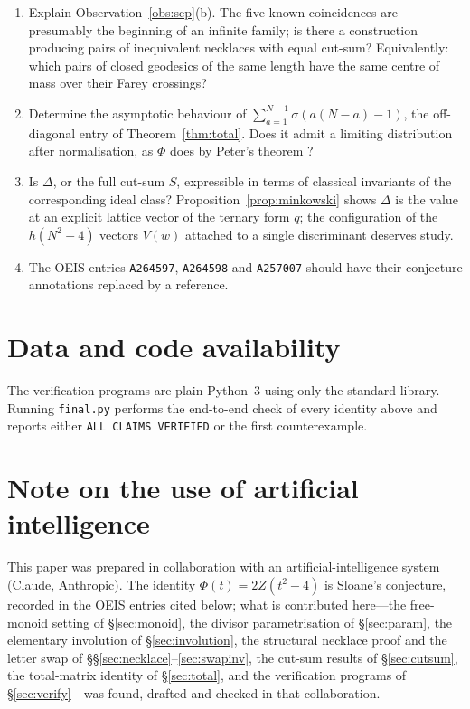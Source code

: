 \documentclass[11pt,reqno]{amsart}
\theoremstyle{plain}
\theoremstyle{definition}
\begin{document}
\begin{enumerate}
\item Explain Observation~\ref{obs:sep}(b). The five known coincidences are presumably
the beginning of an infinite family; is there a construction producing pairs of
inequivalent necklaces with equal cut-sum? Equivalently: which pairs of closed geodesics
of the same length have the same centre of mass over their Farey crossings?
\item Determine the asymptotic behaviour of $\sum_{a=1}^{N-1}\sigma(a(N-a)-1)$, the
off-diagonal entry of Theorem~\ref{thm:total}. Does it admit a limiting distribution
after normalisation, as $\Phi$ does by Peter's theorem \cite{Peter}?
\item Is $\Delta$, or the full cut-sum $S$, expressible in terms of classical invariants
of the corresponding ideal class? Proposition~\ref{prop:minkowski} shows $\Delta$ is the
value at an explicit lattice vector of the ternary form $q$; the configuration of the
$h(N^2-4)$ vectors $V(w)$ attached to a single discriminant deserves study.
\item The OEIS entries \texttt{A264597}, \texttt{A264598} and \texttt{A257007} should
have their conjecture annotations replaced by a reference.
\end{enumerate}

\section*{Data and code availability}

The verification programs are plain Python~3 using only the standard library. Running
\texttt{final.py} performs the end-to-end check of every identity above and reports
either \texttt{ALL CLAIMS VERIFIED} or the first counterexample.

\section*{Note on the use of artificial intelligence}

This paper was prepared in collaboration with an artificial-intelligence system (Claude, Anthropic).
The identity $\Phi(t)=2Z(t^{2}-4)$ is Sloane's conjecture, recorded in the OEIS entries cited below;
what is contributed here---the free-monoid setting of \S\ref{sec:monoid}, the divisor
parametrisation of \S\ref{sec:param}, the elementary involution of \S\ref{sec:involution}, the
structural necklace proof and the letter swap of \S\S\ref{sec:necklace}--\ref{sec:swapinv}, the
cut-sum results of \S\ref{sec:cutsum}, the total-matrix identity of \S\ref{sec:total}, and the
verification programs of \S\ref{sec:verify}---was found, drafted and checked in that collaboration.
\end{document}
